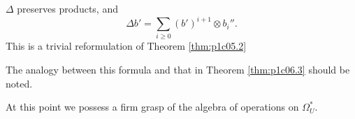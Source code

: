 \documentclass[../main]{subfiles}
\begin{document}
\begin{proposition}\label{prop:p1c06.4}
$\Delta$ preserves products, and 
\[\Delta b' = \sum_{i \geq 0} (b')^{i+1} \otimes b_i''.\]
This is a trivial reformulation of Theorem \ref{thm:p1c05.2}
\end{proposition}

The analogy between this formula and that in Theorem \ref{thm:p1c06.3} should be noted.

At this point we possess a firm grasp of the algebra of operations on $\Omega_U^*$.
\end{document}

